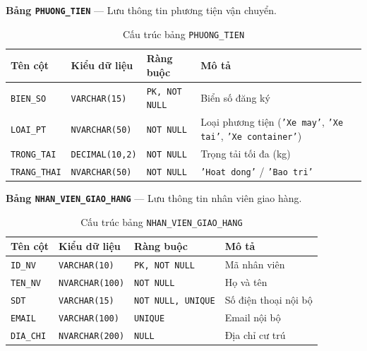 \documentclass[11pt]{report}
\begin{document}
\noindent\textbf{Bảng \texttt{PHUONG\_TIEN}} --- Lưu thông tin phương tiện vận chuyển.
\begin{table}[H]
    \centering
    \renewcommand{\tabularxcolumn}[1]{m{#1}}
    \begin{tabularx}{\textwidth}{|l|l|l|X|} \hline
        \rowcolor{teal!30}
        \textbf{Tên cột} & \textbf{Kiểu dữ liệu} & \textbf{Ràng buộc} & \textbf{Mô tả} \\ \hline
        \texttt{BIEN\_SO}    & \texttt{VARCHAR(15)}   & \texttt{PK, NOT NULL}  & Biển số đăng ký \\ \hline
        \texttt{LOAI\_PT}    & \texttt{NVARCHAR(50)}  & \texttt{NOT NULL}      & Loại phương tiện (\texttt{'Xe may'}, \texttt{'Xe tai'}, \texttt{'Xe container'}) \\ \hline
        \texttt{TRONG\_TAI}  & \texttt{DECIMAL(10,2)} & \texttt{NOT NULL}      & Trọng tải tối đa (kg) \\ \hline
        \texttt{TRANG\_THAI} & \texttt{NVARCHAR(50)}  & \texttt{NOT NULL}      & \texttt{'Hoat dong'} / \texttt{'Bao tri'} \\ \hline
    \end{tabularx}
    \caption{Cấu trúc bảng \texttt{PHUONG\_TIEN}}
    \label{tab:str_phuongtien}
\end{table}

\noindent\textbf{Bảng \texttt{NHAN\_VIEN\_GIAO\_HANG}} --- Lưu thông tin nhân viên giao hàng.
\begin{table}[H]
    \centering
    \renewcommand{\tabularxcolumn}[1]{m{#1}}
    \begin{tabularx}{\textwidth}{|l|l|l|X|} \hline
        \rowcolor{teal!30}
        \textbf{Tên cột} & \textbf{Kiểu dữ liệu} & \textbf{Ràng buộc} & \textbf{Mô tả} \\ \hline
        \texttt{ID\_NV}   & \texttt{VARCHAR(10)}   & \texttt{PK, NOT NULL}     & Mã nhân viên \\ \hline
        \texttt{TEN\_NV}  & \texttt{NVARCHAR(100)} & \texttt{NOT NULL}         & Họ và tên \\ \hline
        \texttt{SDT}      & \texttt{VARCHAR(15)}   & \texttt{NOT NULL, UNIQUE} & Số điện thoại nội bộ \\ \hline
        \texttt{EMAIL}    & \texttt{VARCHAR(100)}  & \texttt{UNIQUE}           & Email nội bộ \\ \hline
        \texttt{DIA\_CHI} & \texttt{NVARCHAR(200)} & \texttt{NULL}             & Địa chỉ cư trú \\ \hline
    \end{tabularx}
    \caption{Cấu trúc bảng \texttt{NHAN\_VIEN\_GIAO\_HANG}}
    \label{tab:str_nhanvien}
\end{table}
\end{document}
